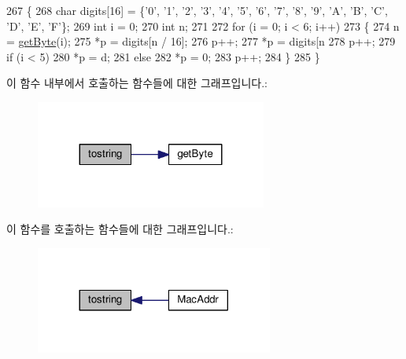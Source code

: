 \begin{DoxyCode}
267     \{
268         \textcolor{keywordtype}{char} digits[16] = \{\textcolor{charliteral}{'0'}, \textcolor{charliteral}{'1'}, \textcolor{charliteral}{'2'}, \textcolor{charliteral}{'3'}, \textcolor{charliteral}{'4'}, \textcolor{charliteral}{'5'}, \textcolor{charliteral}{'6'}, \textcolor{charliteral}{'7'}, \textcolor{charliteral}{'8'}, \textcolor{charliteral}{'9'}, \textcolor{charliteral}{'A'}, \textcolor{charliteral}{'B'}, \textcolor{charliteral}{'C'}, \textcolor{charliteral}{'D'}, \textcolor{charliteral}{'E'}, \textcolor{charliteral}{'F'}\};
269         \textcolor{keywordtype}{int} i = 0;
270         \textcolor{keywordtype}{int} n;
271 
272         \textcolor{keywordflow}{for} (i = 0; i < 6; i++)
273         \{
274             n = \hyperlink{classavdecc__lib_1_1utility_1_1_mac_addr_a0ea3490a600ad3df194b38fc2d1ba264}{getByte}(i);
275             *p = digits[n / 16];
276             p++;
277             *p = digits[n %
278             p++;
279             \textcolor{keywordflow}{if} (i < 5)
280                 *p = d;
281             \textcolor{keywordflow}{else}
282                 *p = 0;
283             p++;
284         \}
285     \}
\end{DoxyCode}


이 함수 내부에서 호출하는 함수들에 대한 그래프입니다.\+:
\nopagebreak
\begin{figure}[H]
\begin{center}
\leavevmode
\includegraphics[width=215pt]{classavdecc__lib_1_1utility_1_1_mac_addr_a167ef5374b6a9aa8e08c427eb580ad45_cgraph}
\end{center}
\end{figure}




이 함수를 호출하는 함수들에 대한 그래프입니다.\+:
\nopagebreak
\begin{figure}[H]
\begin{center}
\leavevmode
\includegraphics[width=221pt]{classavdecc__lib_1_1utility_1_1_mac_addr_a167ef5374b6a9aa8e08c427eb580ad45_icgraph}
\end{center}
\end{figure}




